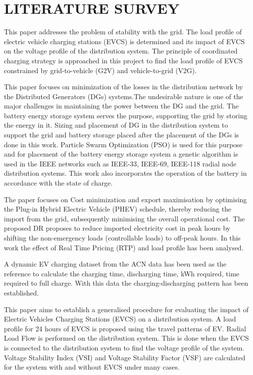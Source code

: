 \chapter{LITERATURE SURVEY}
	\label{chap:LR}
	
	\cite{base} This paper addresses the problem of stability with the grid. The load profile of electric vehicle charging stations (EVCS) is determined  and its impact of EVCS on the voltage profile of the distribution system. The principle of coordinated charging strategy is approached in this project to find the load profile of EVCS constrained by grid-to-vehicle (G2V) and vehicle-to-grid (V2G). 
	
	\noindent \cite{soc} This paper focuses on minimization of the losses in the distribution network by  the Distributed Generators (DGs) systems.The undesirable nature is one of the major challenges in maintaining the power between the DG and the grid. The battery energy storage system serves the purpose, supporting the grid by storing the energy in it. Sizing and placement of DG in the distribution system to support the grid and  battery storage placed after the placement of the DGs is done in this work. Particle Swarm Optimization (PSO) is used for this purpose and for placement of the battery energy storage system a genetic algorithm is used in the IEEE networks such as IEEE-33, IEEE-69, IEEE-118 radial node distribution systems. This work also incorporates  the operation of the battery in accordance with the state of charge. 
	
	
	\noindent \cite{rtp} The paper focuses on Cost minimization and export maximisation  by optimising  the Plug-in Hybrid Electric Vehicle (PHEV) schedule, thereby reducing the import from the grid, subsequently minimising the overall operational cost. The proposed DR proposes to  reduce imported electricity cost in peak hours by shifting the non-emergency loads (controllable loads) to off-peak hours. In this work the effect of Real Time Pricing (RTP) and load profile has been analysed.
	
	\noindent \cite{evdata} A dynamic EV charging dataset from the ACN data has been used as the reference to calculate the charging time, discharging time, kWh required, time required to full charge. With this data the charging-discharging pattern has been established. 
	
	\noindent \cite{33bus} This paper aims to establish a generalised procedure for evaluating the impact of Electric Vehicles Charging Stations (EVCS) on a distribution system. A load profile for 24 hours of EVCS is proposed using the travel patterns of EV. Radial Load Flow is performed on the distribution system. This is done when the EVCS is connected to the distribution system to find the voltage profile of the system. Voltage Stability Index (VSI) and Voltage Stability Factor (VSF) are calculated for the system with and without EVCS under many cases.
	
